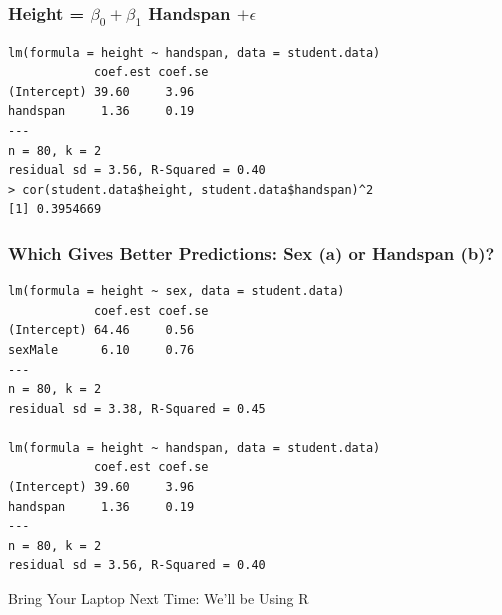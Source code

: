 \documentclass[handout]{beamer}
\begin{document}

\begin{frame}[fragile]
\frametitle{Height = $\beta_0 + \beta_1$ Handspan $+ \epsilon$}
\footnotesize
\begin{verbatim}
lm(formula = height ~ handspan, data = student.data)
            coef.est coef.se
(Intercept) 39.60     3.96  
handspan     1.36     0.19  
---
n = 80, k = 2
residual sd = 3.56, R-Squared = 0.40
> cor(student.data$height, student.data$handspan)^2
[1] 0.3954669
\end{verbatim}
\end{frame}


\begin{frame}[fragile]
\frametitle{Which Gives Better Predictions: Sex (a) or Handspan (b)?}
\footnotesize
\begin{verbatim}
lm(formula = height ~ sex, data = student.data)
            coef.est coef.se
(Intercept) 64.46     0.56  
sexMale      6.10     0.76  
---
n = 80, k = 2
residual sd = 3.38, R-Squared = 0.45

lm(formula = height ~ handspan, data = student.data)
            coef.est coef.se
(Intercept) 39.60     3.96  
handspan     1.36     0.19  
---
n = 80, k = 2
residual sd = 3.56, R-Squared = 0.40
\end{verbatim}

\end{frame}


\begin{frame}
\begin{center}
\Huge Bring Your Laptop Next Time: We'll be Using R
\end{center}

\end{frame}


\end{document}
